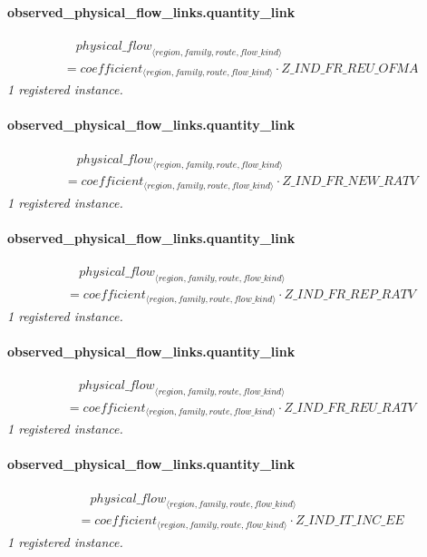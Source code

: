 \documentclass[11pt]{article}
\begin{document}
\paragraph{observed\_physical\_flow\_links.quantity\_link}
\begin{align*}
&\quad {physical\_flow}_{\langle region, family, route, flow\_kind\rangle}\\
&= coefficient_{\langle region, family, route, flow\_kind\rangle} \cdot Z\_IND\_FR\_REU\_OFMA
\end{align*}
\noindent\emph{1 registered instance.}\par
\paragraph{observed\_physical\_flow\_links.quantity\_link}
\begin{align*}
&\quad {physical\_flow}_{\langle region, family, route, flow\_kind\rangle}\\
&= coefficient_{\langle region, family, route, flow\_kind\rangle} \cdot Z\_IND\_FR\_NEW\_RATV
\end{align*}
\noindent\emph{1 registered instance.}\par
\paragraph{observed\_physical\_flow\_links.quantity\_link}
\begin{align*}
&\quad {physical\_flow}_{\langle region, family, route, flow\_kind\rangle}\\
&= coefficient_{\langle region, family, route, flow\_kind\rangle} \cdot Z\_IND\_FR\_REP\_RATV
\end{align*}
\noindent\emph{1 registered instance.}\par
\paragraph{observed\_physical\_flow\_links.quantity\_link}
\begin{align*}
&\quad {physical\_flow}_{\langle region, family, route, flow\_kind\rangle}\\
&= coefficient_{\langle region, family, route, flow\_kind\rangle} \cdot Z\_IND\_FR\_REU\_RATV
\end{align*}
\noindent\emph{1 registered instance.}\par
\paragraph{observed\_physical\_flow\_links.quantity\_link}
\begin{align*}
&\quad {physical\_flow}_{\langle region, family, route, flow\_kind\rangle}\\
&= coefficient_{\langle region, family, route, flow\_kind\rangle} \cdot Z\_IND\_IT\_INC\_EE
\end{align*}
\noindent\emph{1 registered instance.}\par
\end{document}

